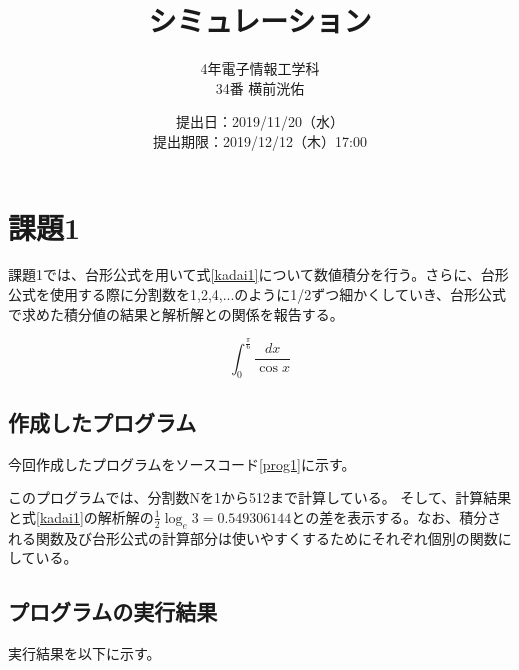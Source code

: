 \documentclass[10pt,titlepage]{jsarticle}
\title{シミュレーション}
\author{4年電子情報工学科\\34番 横前洸佑}
\date{提出日：2019/11/20（水）\\	提出期限：2019/12/12（木）17:00}
\begin{document}
\maketitle

\section{課題1}
課題1では、台形公式を用いて式\ref{kadai1}について数値積分を行う。さらに、台形公式を使用する際に分割数を1,2,4,...のように1/2ずつ細かくしていき、台形公式で求めた積分値の結果と解析解との関係を報告する。

\begin{equation}
\label{kadai1}
	\int_0^\frac{\pi}{6} \frac{dx}{\cos x}
\end{equation}

\subsection{作成したプログラム}
今回作成したプログラムをソースコード\ref{prog1}に示す。



このプログラムでは、分割数Nを1から512まで計算している。
そして、計算結果と式\ref{kadai1}の解析解の$\frac{1}{2}\log_e3=0.549306144$との差を表示する。なお、積分される関数及び台形公式の計算部分は使いやすくするためにそれぞれ個別の関数にしている。

\subsection{プログラムの実行結果}
実行結果を以下に示す。
\begin{oframed}
\end{oframed}
\end{document}
